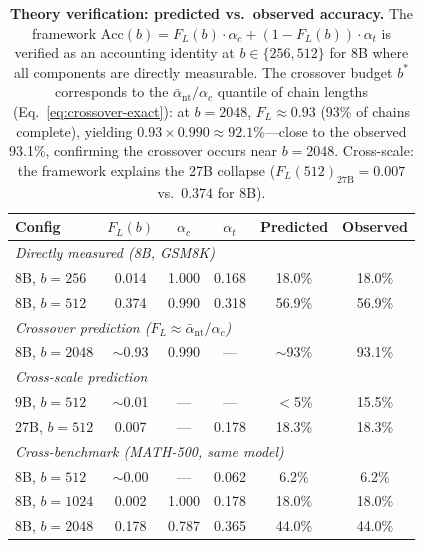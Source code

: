 \begin{table}[ht]
\centering
\caption{\textbf{Theory verification: predicted vs.\ observed accuracy.}
The framework $\mathrm{Acc}(b) = F_L(b)\cdot\alpha_c + (1{-}F_L(b))\cdot\alpha_t$
is verified as an accounting identity at $b{\in}\{256,512\}$ for 8B
where all components are directly measurable.
The crossover budget $b^*$ corresponds to the $\bar{\alpha}_{\mathrm{nt}}/\alpha_c$ quantile of chain lengths
(Eq.~\ref{eq:crossover-exact}): at $b{=}2048$, $F_L \approx 0.93$ (93\% of chains complete), yielding
$0.93 \times 0.990 \approx 92.1\%$---close to the observed 93.1\%, confirming the crossover occurs near $b{=}2048$.
Cross-scale: the framework explains the 27B collapse
($F_L(512)_{27\text{B}} = 0.007$ vs.\ $0.374$ for 8B).}
\label{tab:theory-verification}
\small
\begin{tabular}{lccccc}
\toprule
\textbf{Config} & $F_L(b)$ & $\alpha_c$ & $\alpha_t$ & \textbf{Predicted} & \textbf{Observed} \\
\midrule
\multicolumn{6}{l}{\textit{Directly measured (8B, GSM8K)}} \\
8B, $b{=}256$ & 0.014 & 1.000 & 0.168 & 18.0\% & 18.0\% \\
8B, $b{=}512$ & 0.374 & 0.990 & 0.318 & 56.9\% & 56.9\% \\
\midrule
\multicolumn{6}{l}{\textit{Crossover prediction ($F_L \approx \bar{\alpha}_{\mathrm{nt}}/\alpha_c$)}} \\
8B, $b{=}2048$ & ${\sim}$0.93 & 0.990 & --- & ${\sim}$93\% & 93.1\% \\
\midrule
\multicolumn{6}{l}{\textit{Cross-scale prediction}} \\
9B, $b{=}512$ & ${\sim}$0.01 & --- & --- & $<$5\% & 15.5\% \\
27B, $b{=}512$ & 0.007 & --- & 0.178 & 18.3\% & 18.3\% \\
\midrule
\multicolumn{6}{l}{\textit{Cross-benchmark (MATH-500, same model)}} \\
8B, $b{=}512$ & ${\sim}$0.00 & --- & 0.062 & 6.2\% & 6.2\% \\
8B, $b{=}1024$ & 0.002 & 1.000 & 0.178 & 18.0\% & 18.0\% \\
8B, $b{=}2048$ & 0.178 & 0.787 & 0.365 & 44.0\% & 44.0\% \\
\bottomrule
\end{tabular}
\end{table}


